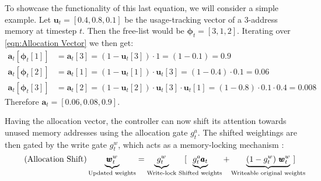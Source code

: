 \documentclass[]{article}
\begin{document}
To showcase the functionality of this last equation, we will consider a simple example. Let $\pmb{u}_t = [0.4, 0.8, 0.1]$ be the usage-tracking vector of a 3-address memory at timestep $t$. Then the free-list would be $\pmb{\phi}_t = [3, 1, 2]$. Iterating over \ref{eqn:Allocation Vector} we then get:
\begin{align*}
\pmb{a}_t[\pmb{\phi}_t[1]] &= \pmb{a}_t[3] = (1-\pmb{u}_t[3]) \cdot 1 = (1-0.1) =0.9 \\
\pmb{a}_t[\pmb{\phi}_t[2]] &= \pmb{a}_t[1] = (1-\pmb{u}_t[1]) \cdot \pmb{u}_t[3] = (1 - 0.4) \cdot 0.1 = 0.06\\
\pmb{a}_t[\pmb{\phi}_t[3]] &= \pmb{a}_t[2] = (1-\pmb{u}_t[2]) \cdot \pmb{u}_t[3] \cdot \pmb{u}_t[1] = (1-0.8) \cdot 0.1 \cdot 0.4 = 0.008
\end{align*}
Therefore $\pmb{a}_t = [0.06, 0.08, 0.9]$. 

Having the allocation vector, the controller can now shift its attention towards unused memory addresses using the allocation gate $g_t^a$. The shifted weightings are then gated by the write gate $g_t^w$, which acts as a memory-locking mechanism :
\[
\tag{Allocation Shift}
\underbrace{\pmb{w}_t^w}_{\text{\scriptsize Updated weights}} = \underbrace{g_t^w}_{\text{Write-lock}} \quad [ \hspace{-10pt} \underbrace{g_t^a \pmb{a}_t}_{\text{\scriptsize Shifted weights}} + \underbrace{(1-g_t^w) \ \pmb{w}_t^w}_{\text{\scriptsize Writeable original weights}} \hspace{-15pt}]
\]
\end{document}
